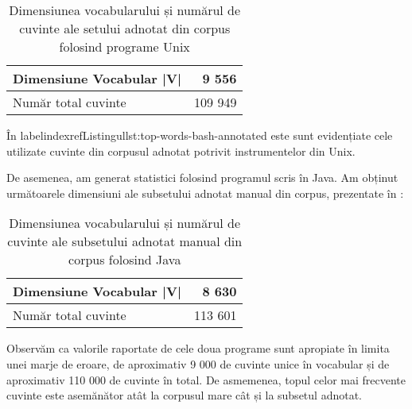 \begin{center}
\begin{table}[htb]
  \caption{Dimensiunea vocabularului și numărul de cuvinte ale setului adnotat din corpus folosind programe Unix}
  \begin{tabular}{|l|r|}
    \hline
    Dimensiune Vocabular |V| & 9 556\\
    \hline
    Număr total cuvinte & 109 949 \\
     \hline
  \end{tabular}
  \label{table:annotated-corpus-vocab-size}
\end{table}
\end{center}

În labelindexref{Listingul}{lst:top-words-bash-annotated} este sunt evidențiate cele utilizate cuvinte din corpusul adnotat potrivit instrumentelor din Unix.

\lstset{language=make}
\lstset{caption=Cele mai folosite cuvinte din limba engleză pentru subsetul adnotat din corpus folosind programe Unix, label=lst:top-words-bash-annotated}


De asemenea, am generat statistici folosind programul scris în Java. Am obținut următoarele dimensiuni ale subsetului adnotat manual din corpus, prezentate în :

\begin{center}
\begin{table}[htb]
  \caption{Dimensiunea vocabularului și numărul de cuvinte ale subsetului adnotat manual din corpus folosind Java}
  \begin{tabular}{|l|r|}
    \hline
    Dimensiune Vocabular |V| & 8 630\\
    \hline
    Număr total cuvinte & 113 601 \\
     \hline
  \end{tabular}
  \label{table:vocabulary-size-java-annotated}
\end{table}
\end{center}

\lstset{language=make}
\lstset{caption=Cele mai folosite cuvinte din limba engleză pentru subsetul adnotat din corpus obținut folosind Java, label=lst:top-words-java-annotated}


Observăm ca valorile raportate de cele doua programe sunt apropiate în limita unei marje de eroare, de aproximativ 9 000 de cuvinte unice în vocabular și de aproximativ 110 000 de cuvinte în total. De asmemenea, topul celor mai frecvente cuvinte este asemănător atât la corpusul mare cât și la subsetul adnotat.

